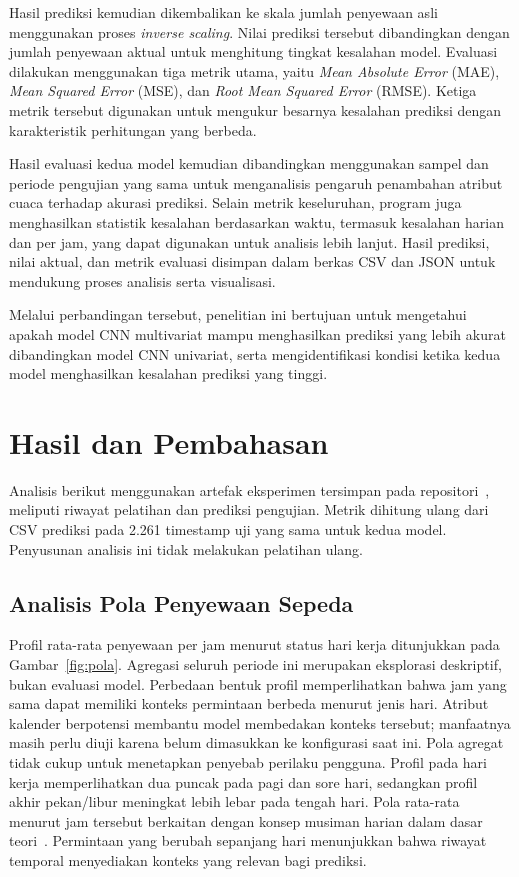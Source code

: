 \documentclass[10pt,conference]{IEEEtran}
\begin{document}
Hasil prediksi kemudian dikembalikan ke skala jumlah penyewaan asli menggunakan proses \textit{inverse scaling}. Nilai prediksi tersebut dibandingkan dengan jumlah penyewaan aktual untuk menghitung tingkat kesalahan model. Evaluasi dilakukan menggunakan tiga metrik utama, yaitu \textit{Mean Absolute Error} (MAE), \textit{Mean Squared Error} (MSE), dan \textit{Root Mean Squared Error} (RMSE). Ketiga metrik tersebut digunakan untuk mengukur besarnya kesalahan prediksi dengan karakteristik perhitungan yang berbeda.

Hasil evaluasi kedua model kemudian dibandingkan menggunakan sampel dan periode pengujian yang sama untuk menganalisis pengaruh penambahan atribut cuaca terhadap akurasi prediksi. Selain metrik keseluruhan, program juga menghasilkan statistik kesalahan berdasarkan waktu, termasuk kesalahan harian dan per jam, yang dapat digunakan untuk analisis lebih lanjut. Hasil prediksi, nilai aktual, dan metrik evaluasi disimpan dalam berkas CSV dan JSON untuk mendukung proses analisis serta visualisasi.

Melalui perbandingan tersebut, penelitian ini bertujuan untuk mengetahui apakah model CNN multivariat mampu menghasilkan prediksi yang lebih akurat dibandingkan model CNN univariat, serta mengidentifikasi kondisi ketika kedua model menghasilkan kesalahan prediksi yang tinggi.

\section{Hasil dan Pembahasan}
Analisis berikut menggunakan artefak eksperimen tersimpan pada repositori~\cite{repo}, meliputi riwayat pelatihan dan prediksi pengujian. Metrik dihitung ulang dari CSV prediksi pada 2.261 timestamp uji yang sama untuk kedua model. Penyusunan analisis ini tidak melakukan pelatihan ulang.

\subsection{Analisis Pola Penyewaan Sepeda}
Profil rata-rata penyewaan per jam menurut status hari kerja ditunjukkan pada Gambar~\ref{fig:pola}. Agregasi seluruh periode ini merupakan eksplorasi deskriptif, bukan evaluasi model. Perbedaan bentuk profil memperlihatkan bahwa jam yang sama dapat memiliki konteks permintaan berbeda menurut jenis hari. Atribut kalender berpotensi membantu model membedakan konteks tersebut; manfaatnya masih perlu diuji karena belum dimasukkan ke konfigurasi saat ini. Pola agregat tidak cukup untuk menetapkan penyebab perilaku pengguna.
Profil pada hari kerja memperlihatkan dua puncak pada pagi dan sore hari, sedangkan profil akhir pekan/libur meningkat lebih lebar pada tengah hari. Pola rata-rata menurut jam tersebut berkaitan dengan konsep musiman harian dalam dasar teori~\cite{forecasting}. Permintaan yang berubah sepanjang hari menunjukkan bahwa riwayat temporal menyediakan konteks yang relevan bagi prediksi.
\end{document}
